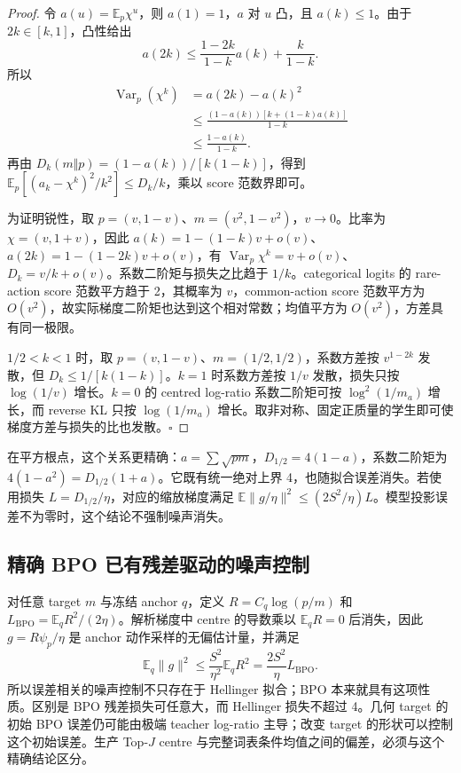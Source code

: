 \documentclass[lang=cn,scheme=chinese,openany]{../book/elegantbook}
\newcommand{\E}{\mathbb E}
\newcommand{\Var}{\operatorname{Var}}
\begin{document}
\begin{proof}
令 $a(u)=\E_p\chi^u$，则 $a(1)=1$，$a$ 对 $u$ 凸，且 $a(k)\le1$。由于 $2k\in[k,1]$，凸性给出
\begin{equation}
 a(2k)\le\frac{1-2k}{1-k}a(k)+\frac{k}{1-k}.
\end{equation}
所以
\begin{align}
 \Var_p(\chi^k)&=a(2k)-a(k)^2\\
 &\le\frac{(1-a(k))[k+(1-k)a(k)]}{1-k}\\
 &\le\frac{1-a(k)}{1-k}.
\end{align}
再由 $D_k(m\Vert p)=(1-a(k))/[k(1-k)]$，得到 $\E_p[(a_k-\chi^k)^2/k^2]\le D_k/k$，乘以 score 范数界即可。

为证明锐性，取 $p=(v,1-v)$、$m=(v^2,1-v^2)$，$v\to0$。比率为 $\chi=(v,1+v)$，因此 $a(k)=1-(1-k)v+o(v)$、$a(2k)=1-(1-2k)v+o(v)$，有 $\Var_p\chi^k=v+o(v)$、$D_k=v/k+o(v)$。系数二阶矩与损失之比趋于 $1/k$。categorical logits 的 rare-action score 范数平方趋于 2，其概率为 $v$，common-action score 范数平方为 $O(v^2)$，故实际梯度二阶矩也达到这个相对常数；均值平方为 $O(v^2)$，方差具有同一极限。

$1/2<k<1$ 时，取 $p=(v,1-v)$、$m=(1/2,1/2)$，系数方差按 $v^{1-2k}$ 发散，但 $D_k\le1/[k(1-k)]$。$k=1$ 时系数方差按 $1/v$ 发散，损失只按 $\log(1/v)$ 增长。$k=0$ 的 centred log-ratio 系数二阶矩可按 $\log^2(1/m_a)$ 增长，而 reverse KL 只按 $\log(1/m_a)$ 增长。取非对称、固定正质量的学生即可使梯度方差与损失的比也发散。\hfill$\square$
\end{proof}

在平方根点，这个关系更精确：$a=\sum\sqrt{pm}$，$D_{1/2}=4(1-a)$，系数二阶矩为 $4(1-a^2)=D_{1/2}(1+a)$。它既有统一绝对上界 4，也随拟合误差消失。若使用损失 $L=D_{1/2}/\eta$，对应的缩放梯度满足 $\E\|g/\eta\|^2\le(2S^2/\eta)L$。模型投影误差不为零时，这个结论不强制噪声消失。

\subsection{精确 BPO 已有残差驱动的噪声控制}

对任意 target $m$ 与冻结 anchor $q$，定义 $R=C_q\log(p/m)$ 和 $L_{\mathrm{BPO}}=\E_qR^2/(2\eta)$。解析梯度中 centre 的导数乘以 $\E_qR=0$ 后消失，因此 $g=R\psi_p/\eta$ 是 anchor 动作采样的无偏估计量，并满足
\begin{equation}
 \E_q\|g\|^2\le\frac{S^2}{\eta^2}\E_qR^2
 =\frac{2S^2}{\eta}L_{\mathrm{BPO}}.
\end{equation}
所以误差相关的噪声控制不只存在于 Hellinger 拟合；BPO 本来就具有这项性质。区别是 BPO 残差损失可任意大，而 Hellinger 损失不超过 4。几何 target 的初始 BPO 误差仍可能由极端 teacher log-ratio 主导；改变 target 的形状可以控制这个初始误差。生产 Top-$J$ centre 与完整词表条件均值之间的偏差，必须与这个精确结论区分。
\end{document}
